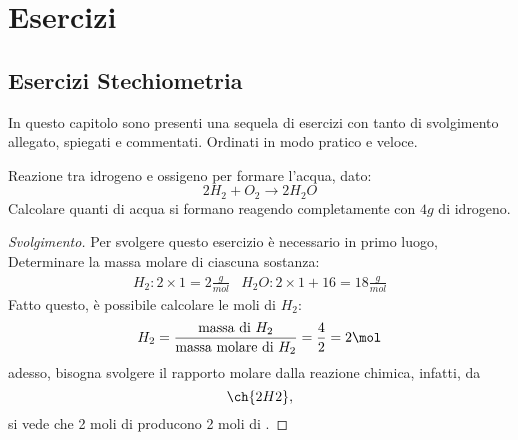 \part{Esercizi}
\label{part:es}

\chapter{Esercizi Stechiometria}
\label{chap:esstechiometria}
In questo capitolo sono presenti una sequela di esercizi con tanto di
svolgimento allegato, spiegati e commentati. Ordinati in modo pratico
e veloce.
\begin{ess}
  Reazione tra idrogeno e ossigeno per formare l'acqua, dato:
  \begin{equation}
    \label{eq:esstechiometria1}
    2H_2+O_2\to 2H_2O
  \end{equation}
  Calcolare quanti di acqua si formano reagendo completamente con $4g$ di
  idrogeno.
\end{ess}
\begin{proof}[Svolgimento]
  Per svolgere questo esercizio è necessario in primo luogo, Determinare la
  massa molare di ciascuna sostanza:
  \begin{eqnarray*}
    H_2:2\times 1=2\frac{g}{mol} & H_2O: 2\times 1+16=18\frac{g}{mol}
  \end{eqnarray*}
  Fatto questo, è possibile calcolare le moli di $H_2$:
  \begin{eqnarray*}
    H_2=\frac{\text{massa di } H_2}{\text{massa molare di }H_2}=\frac{4}{2}=
    2\mol
  \end{eqnarray*}
  adesso, bisogna svolgere il rapporto molare dalla reazione chimica, infatti,
  da \[\ch{2 H2},\] si vede che 2 moli di  producono 2 moli di
  .
\end{proof}
